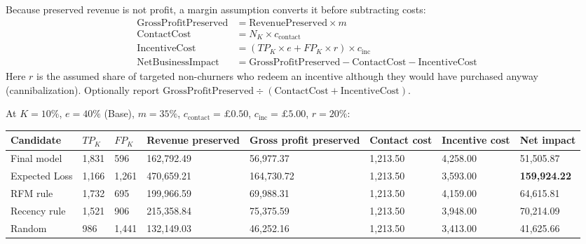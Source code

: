 Because preserved revenue is not profit, a margin assumption converts it before subtracting costs:
\begin{align*}
    \text{GrossProfitPreserved} &= \text{RevenuePreserved} \times m \\
    \text{ContactCost} &= N_K \times c_{\text{contact}} \\
    \text{IncentiveCost} &= (TP_K \times e + FP_K \times r) \times c_{\text{inc}} \\
    \text{NetBusinessImpact} &= \text{GrossProfitPreserved} - \text{ContactCost} - \text{IncentiveCost}
\end{align*}
Here $r$ is the assumed share of targeted non-churners who redeem an incentive although they would have purchased anyway (cannibalization). Optionally report $\text{GrossProfitPreserved} \div (\text{ContactCost} + \text{IncentiveCost})$.

At $K=10\%$, $e=40\%$ (Base), $m=35\%$, $c_{\text{contact}}=\pounds0.50$, $c_{\text{inc}}=\pounds5.00$, $r=20\%$:

\begin{center}
\footnotesize
\setlength{\tabcolsep}{3pt}
\begin{tabular}{@{}p{2.2cm}p{1.3cm}p{1.3cm}p{1.6cm}p{1.9cm}p{1.6cm}p{1.6cm}p{1.9cm}@{}}
    \toprule
    Candidate & $TP_K$ & $FP_K$ & Revenue preserved & Gross profit preserved & Contact cost & Incentive cost & Net impact \\
    \midrule
    Final model & 1,831 & 596 & 162,792.49 & 56,977.37 & 1,213.50 & 4,258.00 & 51,505.87 \\
    Expected Loss & 1,166 & 1,261 & 470,659.21 & 164,730.72 & 1,213.50 & 3,593.00 & \textbf{159,924.22} \\
    RFM rule & 1,732 & 695 & 199,966.59 & 69,988.31 & 1,213.50 & 4,159.00 & 64,615.81 \\
    Recency rule & 1,521 & 906 & 215,358.84 & 75,375.59 & 1,213.50 & 3,948.00 & 70,214.09 \\
    Random & 986 & 1,441 & 132,149.03 & 46,252.16 & 1,213.50 & 3,413.00 & 41,625.66 \\
    \bottomrule
\end{tabular}
\end{center}

